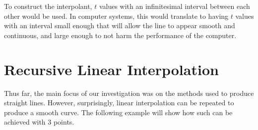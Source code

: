 \documentclass[11pt, oneside]{article}
\theoremstyle{definition}
\numberwithin{figure}{section}
\begin{document}
To construct the interpolant, $t$ values with an infinitesimal interval between each other would be used. In computer systems, this would translate to having $t$ values with an interval small enough that will allow the line to appear smooth and continuous, and large enough to not harm the performance of the computer.

\section{Recursive Linear Interpolation}

Thus far, the main focus of our investigation was on the methods used to produce straight lines. However, surprisingly, linear interpolation can be repeated to produce a smooth curve. The following example will show how such can be achieved with 3 points.
\end{document}

